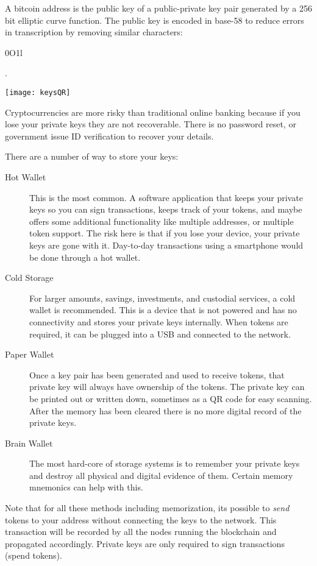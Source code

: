 A bitcoin address is the public key of a public-private key pair generated by a 256 bit elliptic curve function. The public key is encoded in base-58 to reduce errors in transcription by removing similar characters: \begin{code}0O1l\end{code}.
\begin{center}
	\texttt{[image: keysQR]}\end{center}
Cryptocurrencies are more risky than traditional online banking because if you lose your private keys they are not recoverable. There is no password reset, or government issue ID verification to recover your details. 

There are a number of way to store your keys:
\begin{description}
	\item[Hot Wallet] This is the most common. A software application that keeps your private keys so you can sign transactions, keeps track of your tokens, and maybe offers some additional functionality like multiple addresses, or multiple token support. The risk here is that if you lose your device, your private keys are gone with it. Day-to-day transactions using a smartphone would be done through a hot wallet.
	\item[Cold Storage] For larger amounts, savings, investments, and custodial services, a cold wallet is recommended. This is a device that is not powered and has no connectivity and stores your private keys internally. When tokens are required, it can be plugged into a USB and connected to the network. 
	\item[Paper Wallet] Once a key pair has been generated and used to receive tokens, that private key will always have ownership of the tokens. The private key can be printed out or written down, sometimes as a QR code for easy scanning. After the memory has been cleared there is no more digital record of the private keys.
	\item[Brain Wallet] The most hard-core of storage systems is to remember your private keys and destroy all physical and digital evidence of them. Certain memory mnemonics can help with this. 
\end{description}	
Note that for all these methods including memorization, its possible to \textit{send} tokens to your address without connecting the keys to the network. This transaction will be recorded by all the nodes running the blockchain and propagated accordingly. Private keys are only required to sign transactions (spend tokens).

